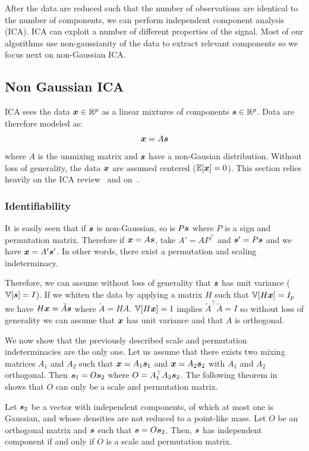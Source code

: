 After the data are reduced such that the number of observations are identical to
the number of components, we can perform independent component analysis (ICA).
ICA can exploit a number of different properties of the signal. Most of our
algorithms use non-gaussianity of the data to extract relevant components so we
focus next on non-Gaussian ICA.

\subsection{Non Gaussian ICA}
ICA sees the data $\boldsymbol{x} \in \mathbb{R}^p$ as a linear mixtures of components $\boldsymbol{s} \in \mathbb{R}^p$.
Data are therefore modeled as:
\begin{align}
  \boldsymbol{x} = A \boldsymbol{s}
\end{align}
where $A$ is the unmixing matrix and $\boldsymbol{s}$ have a non-Gausian distribution.
Without loss of generality, the data $\boldsymbol{x}$ are assumed centered ($\mathbb{E}[\boldsymbol{x}] = 0$).
This section relies heavily on the ICA review~\cite{hyvarinen2000independent}
and on~\cite{cardoso1997infomax}.

\subsubsection{Identifiability}
It is easily seen that if $\boldsymbol{s}$ is non-Gaussian, so is $P \boldsymbol{s}$ where  $P$ is a
sign and permutation matrix.
Therefore if $\boldsymbol{x} = A \boldsymbol{s}$, take $A' = AP^{\top}$ and $\boldsymbol{s}'=P\boldsymbol{s}$ and we have
$\boldsymbol{x} = A' \boldsymbol{s}'$.
In other words, there exist a permutation and scaling indeterminacy.

Therefore, we can assume without loss of generality that $\boldsymbol{s}$ has unit variance ($\mathbb{V}[\boldsymbol{s}] = I$).
If we whiten the data by applying a matrix $H$ such that $\mathbb{V}[H \boldsymbol{x}] = I_p$ we have $H \boldsymbol{x} = \tilde{A} \boldsymbol{s}$ where $\tilde{A} = HA$. $\mathbb{V}[H \boldsymbol{x}] = 1$ implies $\tilde{A}^{\top} \tilde{A} = I$ so without loss of generality we can assume that $\boldsymbol{x}$ has unit variance and that $A$ is orthogonal. 

We now show that the previously described scale and permutation
indeterminacies are the only one.
Let us assume that there exists two mixing matrices $A_1$ and $A_2$ such that
$\boldsymbol{x} = A_1 \boldsymbol{s}_1$ and $\boldsymbol{x} = A_2 \boldsymbol{s}_2$ with $A_1$ and $A_2$ orthogonal. Then $\boldsymbol{s}_1 = O \boldsymbol{s}_2$ where $O = A_1^{\top} A_2 \boldsymbol{s}_2$.
The following theorem in~\cite{comon1994independent}
shows that $O$ can only be a scale and permutation matrix.
\begin{theorem}
  Let $\boldsymbol{s}_2$  be a  vector  with  independent 
  components, of   which  at  most  one  is  Gaussian,  and whose  densities
  are  not  reduced  to  a  point-like  mass. Let $O$ be an orthogonal matrix
  and $\boldsymbol{s}$ such that $\boldsymbol{s} = O \boldsymbol{s}_2$.
  Then, $\boldsymbol{s}$ has independent component if and only if $O$ is a scale and
  permutation matrix.
\end{theorem}

